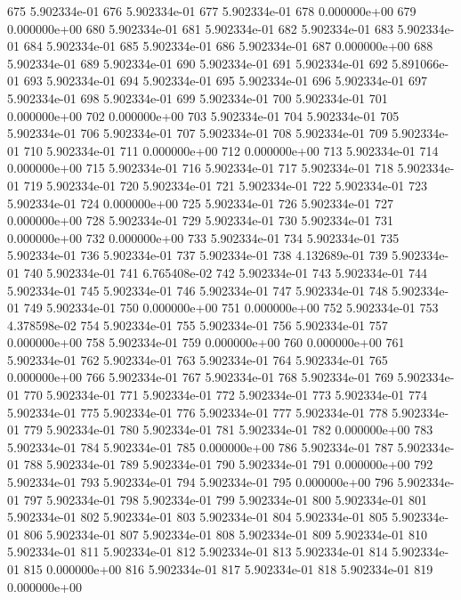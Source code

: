\documentclass{article}
\begin{document}
\begin{Schunk}
\begin{Soutput}
675  5.902334e-01
676  5.902334e-01
677  5.902334e-01
678  0.000000e+00
679  0.000000e+00
680  5.902334e-01
681  5.902334e-01
682  5.902334e-01
683  5.902334e-01
684  5.902334e-01
685  5.902334e-01
686  5.902334e-01
687  0.000000e+00
688  5.902334e-01
689  5.902334e-01
690  5.902334e-01
691  5.902334e-01
692  5.891066e-01
693  5.902334e-01
694  5.902334e-01
695  5.902334e-01
696  5.902334e-01
697  5.902334e-01
698  5.902334e-01
699  5.902334e-01
700  5.902334e-01
701  0.000000e+00
702  0.000000e+00
703  5.902334e-01
704  5.902334e-01
705  5.902334e-01
706  5.902334e-01
707  5.902334e-01
708  5.902334e-01
709  5.902334e-01
710  5.902334e-01
711  0.000000e+00
712  0.000000e+00
713  5.902334e-01
714  0.000000e+00
715  5.902334e-01
716  5.902334e-01
717  5.902334e-01
718  5.902334e-01
719  5.902334e-01
720  5.902334e-01
721  5.902334e-01
722  5.902334e-01
723  5.902334e-01
724  0.000000e+00
725  5.902334e-01
726  5.902334e-01
727  0.000000e+00
728  5.902334e-01
729  5.902334e-01
730  5.902334e-01
731  0.000000e+00
732  0.000000e+00
733  5.902334e-01
734  5.902334e-01
735  5.902334e-01
736  5.902334e-01
737  5.902334e-01
738  4.132689e-01
739  5.902334e-01
740  5.902334e-01
741  6.765408e-02
742  5.902334e-01
743  5.902334e-01
744  5.902334e-01
745  5.902334e-01
746  5.902334e-01
747  5.902334e-01
748  5.902334e-01
749  5.902334e-01
750  0.000000e+00
751  0.000000e+00
752  5.902334e-01
753  4.378598e-02
754  5.902334e-01
755  5.902334e-01
756  5.902334e-01
757  0.000000e+00
758  5.902334e-01
759  0.000000e+00
760  0.000000e+00
761  5.902334e-01
762  5.902334e-01
763  5.902334e-01
764  5.902334e-01
765  0.000000e+00
766  5.902334e-01
767  5.902334e-01
768  5.902334e-01
769  5.902334e-01
770  5.902334e-01
771  5.902334e-01
772  5.902334e-01
773  5.902334e-01
774  5.902334e-01
775  5.902334e-01
776  5.902334e-01
777  5.902334e-01
778  5.902334e-01
779  5.902334e-01
780  5.902334e-01
781  5.902334e-01
782  0.000000e+00
783  5.902334e-01
784  5.902334e-01
785  0.000000e+00
786  5.902334e-01
787  5.902334e-01
788  5.902334e-01
789  5.902334e-01
790  5.902334e-01
791  0.000000e+00
792  5.902334e-01
793  5.902334e-01
794  5.902334e-01
795  0.000000e+00
796  5.902334e-01
797  5.902334e-01
798  5.902334e-01
799  5.902334e-01
800  5.902334e-01
801  5.902334e-01
802  5.902334e-01
803  5.902334e-01
804  5.902334e-01
805  5.902334e-01
806  5.902334e-01
807  5.902334e-01
808  5.902334e-01
809  5.902334e-01
810  5.902334e-01
811  5.902334e-01
812  5.902334e-01
813  5.902334e-01
814  5.902334e-01
815  0.000000e+00
816  5.902334e-01
817  5.902334e-01
818  5.902334e-01
819  0.000000e+00

\end{Soutput}
\end{Schunk}
\end{document}
